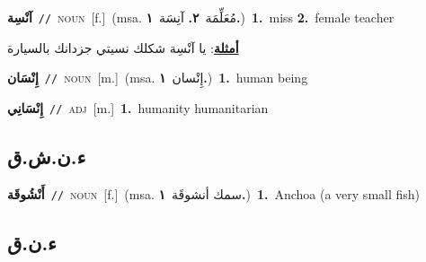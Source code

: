 \documentclass[10pt,a4paper,twoside]{article} %
\begin{document}
\begin{multicols}{2}
{\setlength\topsep{0pt}\textbf{\foreignlanguage{arabic}{آنْسِة}}\ {\color{gray}\texttt{//}\color{black}}\ \textsc{noun}\ [f.]\ \color{gray}(msa. \foreignlanguage{arabic}{مُعَلِّمَة}~\foreignlanguage{arabic}{\textbf{٢.}}  \foreignlanguage{arabic}{آنِسَة}~\foreignlanguage{arabic}{\textbf{١.}})\color{black}\ \textbf{1.}~miss  \textbf{2.}~female teacher\  \begin{flushright}\color{gray}\foreignlanguage{arabic}{\textbf{\underline{\foreignlanguage{arabic}{أمثلة}}}: يا آنْسِة شكلك نسيتي جزدانك بالسيارة}\end{flushright}\color{black}} \vspace{2mm}

{\setlength\topsep{0pt}\textbf{\foreignlanguage{arabic}{إِنْسَان}}\ {\color{gray}\texttt{//}\color{black}}\ \textsc{noun}\ [m.]\ \color{gray}(msa. \foreignlanguage{arabic}{إِنْسان}~\foreignlanguage{arabic}{\textbf{١.}})\color{black}\ \textbf{1.}~human being\ } \vspace{2mm}

{\setlength\topsep{0pt}\textbf{\foreignlanguage{arabic}{إِنْسَانِي}}\ {\color{gray}\texttt{//}\color{black}}\ \textsc{adj}\ [m.]\ \textbf{1.}~humanity humanitarian\ } \vspace{2mm}

\vspace{-3mm}
\subsection*{\color{blue}\foreignlanguage{arabic}{ء.ن.ش.ق}\color{blue}{ (ntws)}} 

{\setlength\topsep{0pt}\textbf{\foreignlanguage{arabic}{أَنْشُوقَة}}\ {\color{gray}\texttt{//}\color{black}}\ \textsc{noun}\ [f.]\ \color{gray}(msa. \foreignlanguage{arabic}{سمك أنشوقَة}~\foreignlanguage{arabic}{\textbf{١.}})\color{black}\ \textbf{1.}~Anchoa (a very small fish)\ } \vspace{2mm}

\vspace{-3mm}
\subsection*{\color{blue}\foreignlanguage{arabic}{ء.ن.ق}\color{blue}{}} 


\end{multicols}
\end{document}
